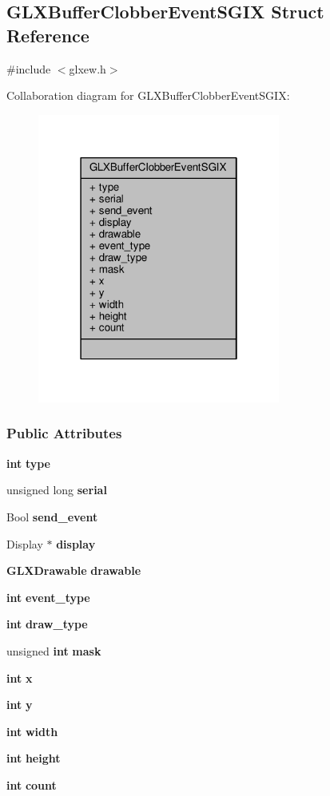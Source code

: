 \subsection{G\+L\+X\+Buffer\+Clobber\+Event\+S\+G\+IX Struct Reference}
\label{structGLXBufferClobberEventSGIX}


{\ttfamily \#include $<$glxew.\+h$>$}



Collaboration diagram for G\+L\+X\+Buffer\+Clobber\+Event\+S\+G\+IX\+:
\nopagebreak
\begin{figure}[H]
\begin{center}
\leavevmode
\includegraphics[width=226pt]{d9/d1b/structGLXBufferClobberEventSGIX__coll__graph}
\end{center}
\end{figure}
\subsubsection*{Public Attributes}
\begin{DoxyCompactItemize}
\item 
{\bf int} {\bf type}
\item 
unsigned long {\bf serial}
\item 
Bool {\bf send\+\_\+event}
\item 
Display $\ast$ {\bf display}
\item 
{\bf G\+L\+X\+Drawable} {\bf drawable}
\item 
{\bf int} {\bf event\+\_\+type}
\item 
{\bf int} {\bf draw\+\_\+type}
\item 
unsigned {\bf int} {\bf mask}
\item 
{\bf int} {\bf x}
\item 
{\bf int} {\bf y}
\item 
{\bf int} {\bf width}
\item 
{\bf int} {\bf height}
\item 
{\bf int} {\bf count}
\end{DoxyCompactItemize}


